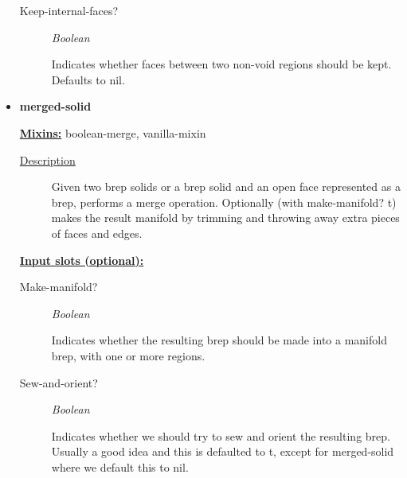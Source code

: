 \documentclass [11pt]{book}
\begin{document}
\begin{itemize}
\begin{description}

\item [Keep-internal-faces?]
\emph{Boolean}

 Indicates whether faces between two non-void regions should be kept.
Defaults to nil.




\end{description}







\item {}
\label{prim:merged-solid}
\textbf{merged-solid}


\textbf{
\underline{Mixins:}} boolean-merge, vanilla-mixin





\begin{description}

\item [
\underline{Description}]


Given two brep solids or a brep solid and an open face represented as a brep,
performs a merge operation. Optionally (with make-manifold? t) makes the result manifold by trimming 
and throwing away extra pieces of faces and edges.



\end{description}








\textbf{
\underline{Input slots (optional):}}

\begin{description}

\item [Make-manifold?]
\emph{Boolean}

 Indicates whether the resulting brep should be made into a manifold brep, with one or more regions.




\item [Sew-and-orient?]
\emph{Boolean}

 Indicates whether we should try to sew and orient the resulting brep. Usually a good idea
and this is defaulted to t, except for merged-solid where we default this to nil.





\end{description}
\end{itemize}
\end{document}

